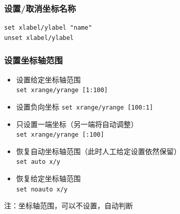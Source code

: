 \subsubsection{设置/取消坐标名称}
 \begin{verbatim}
set xlabel/ylabel "name"
unset xlabel/ylabel
\end{verbatim}


\subsubsection{设置坐标轴范围}
\begin{itemize}
\item 设置给定坐标轴范围\\
\verb|set xrange/yrange [1:100]|

\item 设置负向坐标
\verb|set xrange/yrange [100:1]|

\item 只设置一端坐标（另一端将自动调整）\\
\verb|set xrange/yrange [:100]|

\item 恢复自动坐标轴范围（此时人工给定设置依然保留）\\
\verb|set auto x/y|

\item  恢复给定坐标轴范围\\
\verb|set noauto x/y|
\end{itemize}

注：坐标轴范围，可以不设置，自动判断



